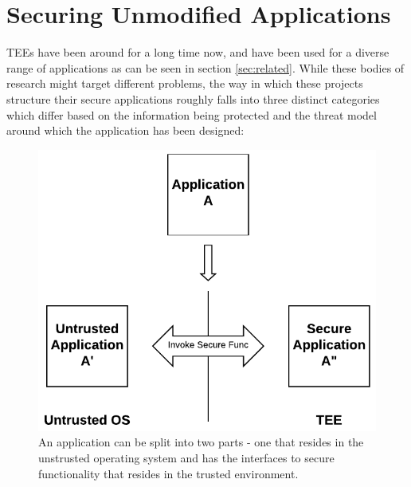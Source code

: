 \chapter{Securing Unmodified Applications}
\label{unmodified_app}
TEEs have been around for a long time now, and have been used for a diverse
range of applications as can be seen in section \ref{sec:related}. While these
bodies of research might target different problems, the way in which these projects
structure their secure applications roughly falls into three distinct categories which
differ based on the information being protected and the threat model around
which the application has been designed: 

\begin{figure}[t]
    \centering
    \includegraphics{fig/split_app.pdf}
    \caption{An application can be split into two parts - one that resides in the unstrusted operating system and has the interfaces to secure functionality that resides in the trusted environment.}
    \label{fig:split_app}
\end{figure}



